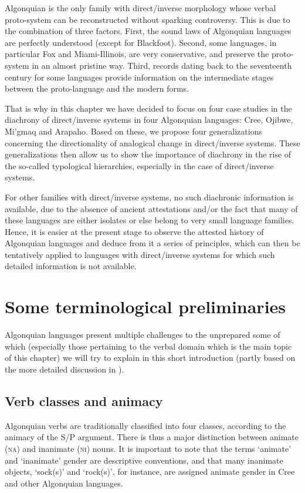 \documentclass[twoside,a4paper,11pt]{article}
\newcommand{\nanim}{\textsc{na}}
\newcommand{\ninan}{\textsc{ni}}
\begin{document}
Algonquian is the only family with direct/inverse morphology whose verbal proto-system can be reconstructed without sparking controversy. This is due to the combination of three factors. First, the sound laws of Algonquian languages are perfectly understood (except for Blackfoot). Second, some languages, in particular Fox and Miami-Illinois, are very conservative, and preserve the proto-system in an almost pristine way. Third, records dating back to the seventeenth century for some languages provide information on the intermediate stages between the proto-language and the modern forms.
 
That is why in this chapter we have decided to focus on four case studies in the diachrony of direct/inverse systems in four Algonquian languages: Cree, Ojibwe, Mi'gmaq and Arapaho. Based on these, we propose four generalizations concerning the directionality of analogical change in direct/inverse systems. These generalizations then allow us to show the importance of diachrony in the rise of the so-called typological hierarchies, especially in the case of direct/inverse systems.

For other families with direct/inverse systems, no such diachronic information is available, due to the absence of ancient attestations and/or the fact that many of these languages are either isolates or else belong to very small language families. Hence, it is easier at the present stage to observe the attested history of Algonquian languages and deduce from it a series of principles, which can then be tentatively applied to languages with direct/inverse systems for which such detailed information is not available. 

\section{Some terminological preliminaries}

Algonquian languages present multiple challenges to the unprepared some of which (especially those pertaining to the verbal domain which is the main topic of this chapter) we will try to explain in this short introduction (partly based on the more detailed discussion in \citealp{jacques14inverse}).

\subsection{Verb classes and animacy}

Algonquian verbs are traditionally classified into four classes, according to the animacy of the S/P argument. There is thus a major distinction between animate (\nanim) and inanimate (\ninan) nouns. It is important to note that the terms `animate' and `inanimate' gender are descriptive conventions, and that many inanimate objects, `sock(s)' and `rock(s)', for instance, are assigned animate gender in Cree and other Algonquian languages.
\end{document}
